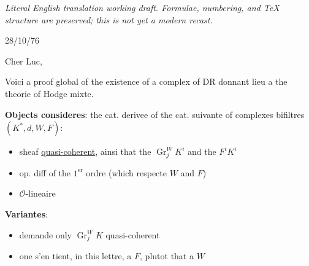 \documentclass[11pt,a4paper]{article}
\DeclareMathOperator{\Gr}{Gr}
\begin{document}
\begin{center}\small\emph{Literal English translation working draft. Formulae, numbering, and TeX structure are preserved; this is not yet a modern recast.}\end{center}
\vspace{0.5em}


\begin{flushright}
28/10/76
\end{flushright}

\vspace{0.5cm}

\noindent Cher Luc,

\vspace{0.5cm}

Voici a proof global of the existence of a complex of DR donnant lieu a the theorie of Hodge mixte.

\vspace{0.3cm}

\noindent \textbf{Objects consideres}: the cat. derivee of the cat. suivante of complexes bifiltres $(K^{*}, d, W, F)$:
\begin{itemize}[leftmargin=2cm]
    \item[$K^{i}$:] sheaf \underline{quasi-coherent}, ainsi that the $\Gr_{j}^{W} K^{i}$ and the $F^{i} K^{i}$
    \item[$d$:] op. diff of the $1^{\text{er}}$ ordre (which respecte $W$ and $F$)
    \item[$\Gr_{j}(d)$:] $\mathcal{O}$-lineaire
\end{itemize}

\vspace{0.3cm}

\noindent \textbf{Variantes}:
\begin{itemize}[leftmargin=2cm]
    \item[a)] demande only $\Gr_{j}^{W} K$ quasi-coherent
    \item[b)] one s'en tient, in this lettre, a $F$, plutot that a $W$
\end{itemize}

\vspace{0.3cm}
\end{document}
